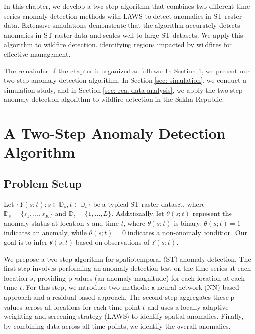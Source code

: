 \documentclass[11pt]{article}
\begin{document}
In this chapter, we develop a two-step algorithm that combines two different time series anomaly detection methods with LAWS to detect anomalies in ST raster data. Extensive simulations demonstrate that the algorithm accurately detects anomalies in ST raster data and scales well to large ST datasets. We apply this algorithm to wildfire detection, identifying regions impacted by wildfires for effective management.



The remainder of the chapter is organized as follows:
In Section \ref{sec: spatiotemporal anomaly detection}, we present our two-step anomaly detection algorithm.
In Section \ref{sec: simulation}, we conduct a simulation study, and in Section \ref{sec: real data analysis}, we apply the two-step anomaly detection algorithm to wildfire detection in the Sakha Republic.



\section{A Two-Step Anomaly Detection Algorithm}\label{sec: spatiotemporal anomaly detection}

\subsection{Problem Setup}
Let $\{Y(s;t): s \in \mathbb{D}_s, t \in \mathbb{D}_t\}$ be a typical ST raster dataset, where $\mathbb{D}_s = \{s_1, \ldots, s_K\}$ and $\mathbb{D}_t = \{1,\ldots, L\}$. Additionally, let $\theta(s;t)$ represent the anomaly status at location $s$ and time $t$, where $\theta(s;t)$ is binary: $\theta(s;t) = 1$ indicates an anomaly, while $\theta(s;t) = 0$ indicates a non-anomaly condition. Our goal is to infer $\theta(s;t)$ based on observations of $Y(s;t)$.



We propose a two-step algorithm for spatiotemporal (ST) anomaly detection. The first step involves performing an anomaly detection test on the time series at each location $s$, providing p-values (an anomaly magnitude) for each location at each time $t$. For this step, we introduce two methods: a neural network (NN) based approach and a residual-based approach. The second step aggregates these p-values across all locations for each time point $t$ and uses a locally adaptive weighting and screening strategy (LAWS) to identify spatial anomalies. Finally, by combining data across all time points, we identify the overall anomalies. 
\end{document}
